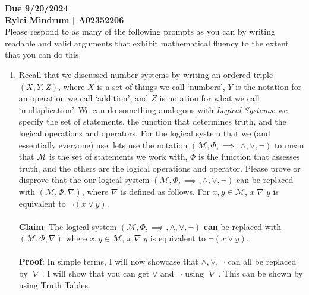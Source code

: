 \documentclass[10pt, AMS Euler]{article}
\begin{document}
  {\bf Due 9/20/2024}  \\
\textbf{Rylei Mindrum | A02352206} \\
Please respond to as many of the following prompts as you can
	by writing readable and valid arguments that exhibit mathematical fluency to the extent that you can do this.
	
	\begin{enumerate}
		
		
		
		
		
		\item Recall that we discussed number systems by writing an ordered triple $(X, Y, Z)$, where $X$ is a set of things we call `numbers',
		$Y$ is the notation for an operation we call `addition', and $Z$ is notation for what we call `multiplication'.
		We can do something analogous with \emph{Logical Systems}: we specify the set of statements, the function that determines truth, and the
		logical operations and operators.  For the logical system that we (and essentially everyone) use, lets use the notation
		$(\mathcal{M}, \Phi, \implies, \wedge, \vee, \neg)$ to mean that $\mathcal{M}$ is the set of statements we work with,
		$\Phi$ is the function that assesses truth, and the others are the logical operations and operator.
Please prove or disprove that the our logical system $(\mathcal{M}, \Phi, \implies, \wedge, \vee, \neg)$ can be replaced with
		$(\mathcal{M}, \Phi, \nabla)$, where $\nabla$ is defined as follows.  For $x, y \in \mathcal{M}$, $x \; \nabla\;y$ is equivalent to
		$\neg(x \vee y)$.
\\\\
		\textbf{Claim}: The logical system $(\mathcal{M}, \Phi, \implies, \wedge, \vee, \neg)$ \textbf{can} be replaced with $(\mathcal{M}, \Phi, \nabla)$ where $x, y \in \mathcal{M}$, $x \; \nabla\;y$ is equivalent to $\neg(x \vee y)$.             
		\\\\
		\textbf{Proof}: In simple terms, I will now showcase that $ \wedge, \vee, \neg $ can all be replaced by  $\; \nabla\;$.  I will show that you can get $\vee$ and $ \neg $ using $\; \nabla\;$.  This can be shown by using Truth Tables. 


\end{enumerate}
\end{document}

